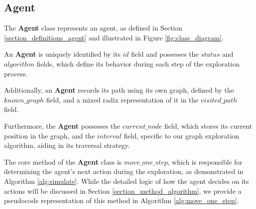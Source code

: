 \subsection{Agent}
\label{section_modeling_agent}

The \textbf{Agent} class represents an agent, as defined in Section \ref{section_definitions_agent} and illustrated in Figure \ref{fig:class_diagram}.

An \textbf{Agent} is uniquely identified by its $id$ field and possesses the $status$ and $algorithm$ fields,
which define its behavior during each step of the exploration process.

Additionally, an \textbf{Agent} records its path using its own graph, defined by the $known\_graph$ field,
and a mixed radix representation of it in the $visited\_path$ field. 

Furthermore, the \textbf{Agent} possesses the $current\_node$ field, which stores its current position in the graph, and the $interval$ field, specific to our graph exploration algorithm, aiding in its traversal strategy.

The core method of the \textbf{Agent} class is $move\_one\_step$,
which is responsible for determining the agent's next action during the exploration,
as demonstrated in Algorithm \ref{alg:simulate}.
While the detailed logic of how the agent decides on its actions will be discussed in Section \ref{section_method_algorithm},
we provide a pseudocode representation of this method in Algorithm \ref{alg:move_one_step}.



